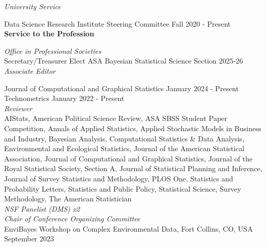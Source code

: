 \documentclass[margin,line]{res}
\begin{document}
\begin{resume}
\vspace{-.3cm}
{\em University Service}

\vspace{-.3cm}
Data Science Research Institute Steering Committee \hfill {Fall 2020 - Present} \\

{\bf Service to the Profession}

\vspace{-.3cm}
{\em Office in Professional Societies} \\
Secretary/Treasurer Elect ASA Bayesian Statistical Science Section \hfill {2025-26} \\

\vspace{-.3cm}
{\em Associate Editor}

\vspace{-.3cm}
Journal of Computational and Graphical Statistics \hfill {January 2024 - Present} \\
Technometrics \hfill {January 2022 - Present} \\

{\em Reviewer} \\
AIStats, American Political Science Review, ASA SBSS Student Paper Competition, Annals of Applied Statistics, Applied Stochastic Models in Business and Industry, Bayesian Analysis, Computational Statistics \& Data Analysis, Environmental and Ecological Statistics, Journal of the American Statistical Association, Journal of Computational and Graphical Statistics, Journal of the Royal Statistical Society, Section A, Journal of Statistical Planning and Inference, Journal of Survey Statistics and Methodology, PLOS One, Statistics and Probability Letters, Statistics and Public Policy, Statistical Science, Survey Methodology, The American Statistician \\

\vspace{-.3cm}
{\em NSF Panelist (DMS) x2} \\

\vspace{-.3cm}
{\em Chair of Conference Organizing Committee} \\
EnviBayes Workshop on Complex Environmental Data, Fort Collins, CO, USA \hfill {September 2023} \\


\end{resume}
\end{document}
